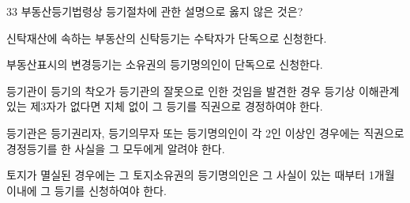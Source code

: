 \begin{question}{33}
부동산등기법령상 등기절차에 관한 설명으로 옳지 않은 것은?
\begin{choices}
  \item 신탁재산에 속하는 부동산의 신탁등기는 수탁자가 단독으로 신청한다.
  \item 부동산표시의 변경등기는 소유권의 등기명의인이 단독으로 신청한다.
  \item 등기관이 등기의 착오가 등기관의 잘못으로 인한 것임을 발견한 경우 등기상 이해관계 있는 제3자가 없다면 지체 없이 그 등기를 직권으로 경정하여야 한다.
  \item 등기관은 등기권리자, 등기의무자 또는 등기명의인이 각 2인 이상인 경우에는 직권으로 경정등기를 한 사실을 그 모두에게 알려야 한다.
  \item 토지가 멸실된 경우에는 그 토지소유권의 등기명의인은 그 사실이 있는 때부터 1개월 이내에 그 등기를 신청하여야 한다.
\end{choices}
\end{question}
